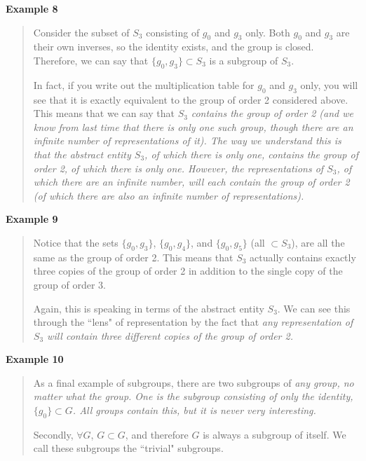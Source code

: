 \documentclass[12pt,epsf]{article}
\begin{document}
\bf Example 8 \rm
\vspace*{-2ex}
\begin{quote}
Consider the subset of $S_3$ consisting of $g_0$ and
$g_3$ only.  Both $g_0$ and $g_3$ are their own inverses, so the
identity exists, and the group is closed.  Therefore, we can say that
$\{g_0,g_3\}\subset S_3$ is a subgroup of $S_3$.  

In fact, if you write out the multiplication table for $g_0$ and $g_3$
only, you will see that it is exactly equivalent to the group of order
2 considered above.  This means that we can say that $S_3$ \it
contains \rm the group of order 2 (and we know from last time that
there is only one such group, though there are an infinite number of
representations of it).  The way we understand this is that the
abstract entity $S_3$, of which there is only one, contains the group
of order 2, of which there is only one.  However, the \it
representations \rm of $S_3$, of which there are an infinite number,
will \it each \rm contain the group of order 2 (of which there are
also an infinite number of representations).  
\end{quote}

\bf Example 9 \rm
\vspace*{-2ex}
\begin{quote}
Notice that the sets $\{g_0,g_3\}$, $\{g_0,g_4\}$,
and $\{g_0,g_5\}$ (all $\subset S_3$), are all the same as the group of
order 2.  This means that $S_3$ actually contains exactly three
copies of the group of order 2 in addition to the single copy of the
group of order 3.  

Again, this is speaking in terms of the abstract entity $S_3$.	We can
see this through the ``lens" of representation by the fact that \it any
\rm representation of $S_3$ will contain three different copies of the
group of order 2.  
\end{quote}

\newpage
\bf Example 10 \rm
\vspace*{-2ex}
\begin{quote}
 As a final example of subgroups, there are two subgroups of \it
any \rm group, no matter what the group.  One is the subgroup
consisting of only the identity, $\{g_0\} \subset G$.  All groups
contain this, but it is never very interesting.  

Secondly, $\forall G$, $G \subset G$, and therefore $G$ is always a
subgroup of itself.  We call these subgroups the ``trivial" subgroups.  
\end{quote}
\end{document}
